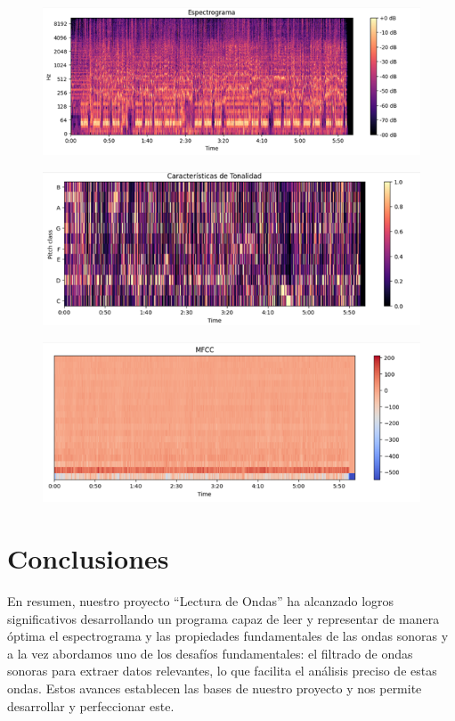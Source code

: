 \documentclass[letterpaper, 12pt]{article}
\begin{document}
\begin{figure}[H]
	\begin{center}
		\includegraphics[width=.7\linewidth]{./Images/DatosExperimentales_2.png}
		\caption{}
	\end{center}
\end{figure}

\begin{figure}[H]
	\begin{center}
		\includegraphics[width=.7\linewidth]{./Images/DatosExperimentales_3.png}
		\caption{}
	\end{center}
\end{figure}

\begin{figure}[H]
	\begin{center}
		\includegraphics[width=.7\linewidth]{./Images/DatosExperimentales_4.png}
		\caption{}
	\end{center}
\end{figure}

\section*{Conclusiones}

En resumen, nuestro proyecto ``Lectura de Ondas'' ha
alcanzado logros significativos desarrollando un programa
capaz de leer y representar de manera óptima el
espectrograma y las propiedades fundamentales de las ondas
sonoras y a la vez abordamos uno de los desafíos
fundamentales: el filtrado de ondas sonoras para extraer
datos relevantes, lo que facilita el análisis preciso de
estas ondas. Estos avances establecen las bases de nuestro
proyecto y nos permite desarrollar y perfeccionar este.

\nocite{source_code}

\printbibliography
\end{document}
